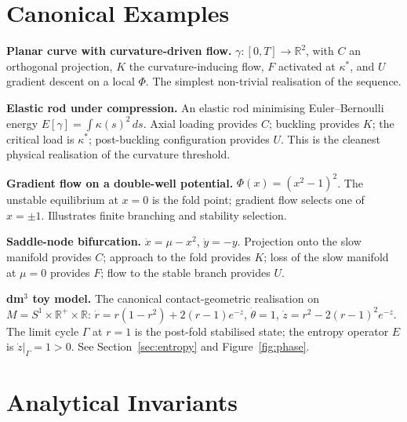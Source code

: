 \documentclass[12pt,a4paper]{article}
\begin{document}
\section{Canonical Examples}
\label{sec:examples}

\textbf{Planar curve with curvature-driven flow.}
$\gamma : [0,T] \to \mathbb{R}^2$, with $C$ an orthogonal projection,
$K$ the curvature-inducing flow, $F$ activated at $\kappa^*$, and $U$
gradient descent on a local $\Phi$.
The simplest non-trivial realisation of the sequence.

\textbf{Elastic rod under compression.}
An elastic rod minimising Euler--Bernoulli energy
$E[\gamma] = \int \kappa(s)^2\,ds$.
Axial loading provides $C$; buckling provides $K$; the critical load
is $\kappa^*$; post-buckling configuration provides $U$.
This is the cleanest physical realisation of the curvature threshold.

\textbf{Gradient flow on a double-well potential.}
$\Phi(x) = (x^2 - 1)^2$.
The unstable equilibrium at $x = 0$ is the fold point; gradient flow
selects one of $x = \pm 1$.
Illustrates finite branching and stability selection.

\textbf{Saddle-node bifurcation.}
$\dot{x} = \mu - x^2$, $\dot{y} = -y$.
Projection onto the slow manifold provides $C$; approach to the fold
provides $K$; loss of the slow manifold at $\mu = 0$ provides $F$;
flow to the stable branch provides $U$.

\textbf{dm$^3$ toy model.}
The canonical contact-geometric realisation on
$M = S^1 \times \mathbb{R}^+ \times \mathbb{R}$:
$\dot{r} = r(1-r^2) + 2(r-1)e^{-z}$,
$\dot\theta = 1$,
$\dot{z} = r^2 - 2(r-1)^2 e^{-z}$.
The limit cycle $\Gamma$ at $r = 1$ is the post-fold stabilised state;
the entropy operator $E$ is $\dot{z}|_\Gamma = 1 > 0$.
See Section~\ref{sec:entropy} and Figure~\ref{fig:phase}.

\section{Analytical Invariants}
\label{sec:invariants}
\end{document}
